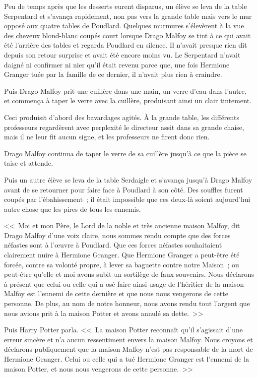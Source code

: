 Peu de temps après que les desserts eurent disparus, un élève se leva de la table Serpentard et s'avança rapidement, non pas vers la grande table mais vers le mur opposé aux quatre tables de Poudlard. Quelques murmures s'élevèrent à la vue des cheveux blond-blanc coupés court lorsque Drago Malfoy se tint à ce qui avait été l'arrière des tables et regarda Poudlard en silence. Il n'avait presque rien dit depuis son retour surprise et avait été encore moins vu. Le Serpentard n'avait daigné ni confirmer ni nier qu'il était revenu parce que, une fois Hermione Granger tuée par la famille de ce dernier, il n'avait plus rien à craindre.

Puis Drago Malfoy prit une cuillère dans une main, un verre d'eau dans l'autre, et commença à taper le verre avec la cuillère, produisant ainsi un clair tintement.

Ceci produisit d'abord des bavardages agités. À la grande table, les différents professeurs regardèrent avec perplexité le directeur assit dans sa grande chaise, mais il ne leur fit aucun signe, et les professeurs ne firent donc rien.

Drago Malfoy continua de taper le verre de sa cuillère jusqu'à ce que la pièce se taise et attende.

Puis un autre élève se leva de la table Serdaigle et s'avança jusqu'à Drago Malfoy avant de se retourner pour faire face à Poudlard à son côté. Des souffles furent coupés par l'ébahissement~; il était impossible que ces deux-là soient aujourd'hui autre chose que les pires de tous les ennemis.

<<~Moi et mon Père, le Lord de la noble et très ancienne maison Malfoy, dit Drago Malfoy d'une voix claire, nous sommes rendu compte que des forces néfastes sont à l'œuvre à Poudlard. Que ces forces néfastes souhaitaient clairement nuire à Hermione Granger. Que Hermione Granger a peut-être été forcée, contre sa volonté propre, à lever sa baguette contre notre Maison~; ou peut-être qu'elle et moi avons subit un sortilège de faux souvenirs. Nous déclarons à présent que celui ou celle qui a osé faire ainsi usage de l'héritier de la maison Malfoy est l'ennemi de cette dernière et que nous nous vengerons de cette personne. De plus, au nom de notre honneur, nous avons rendu tout l'argent que nous avions prit à la maison Potter et avons annulé sa dette.~>>

Puis Harry Potter parla. <<~La maison Potter reconnaît qu'il s'agissait d'une erreur sincère et n'a aucun ressentiment envers la maison Malfoy. Nous croyons et déclarons publiquement que la maison Malfoy n'est pas responsable de la mort de Hermione Granger. Celui ou celle qui a tué Hermione Granger est l'ennemi de la maison Potter, et nous nous vengerons de cette personne.~>>

